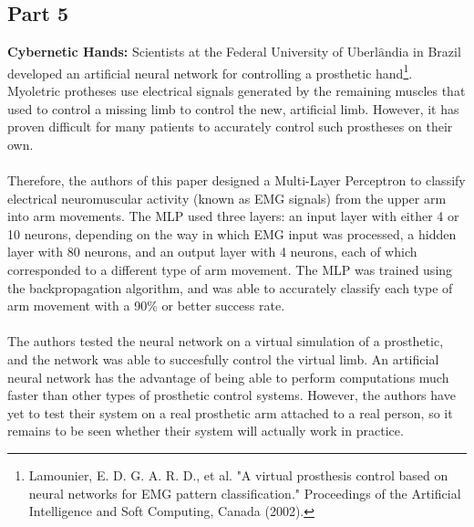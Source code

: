 \documentclass[11pt]{article}
\begin{document}
\subsection*{Part 5}

{\bf Cybernetic Hands:} Scientists at the Federal University of Uberl$\hat{\text{a}}$ndia in Brazil developed an artificial neural network for controlling a prosthetic hand\footnote{Lamounier, E. D. G. A. R. D., et al. "A virtual prosthesis control based on neural networks for EMG pattern classification." Proceedings of the Artificial Intelligence and Soft Computing, Canada (2002).}. Myoletric protheses use electrical signals generated by the remaining muscles that used to control a missing limb to control the new, artificial limb. However, it has proven difficult for many patients to accurately control such prostheses on their own. \\
\\
Therefore, the authors of this paper designed a Multi-Layer Perceptron to classify electrical neuromuscular activity (known as EMG signals) from the upper arm into arm movements. The MLP used three layers: an input layer with either 4 or 10 neurons, depending on the way in which EMG input was processed, a hidden layer with 80 neurons, and an output layer with 4 neurons, each of which corresponded to a different type of arm movement. The MLP was trained using the backpropagation algorithm, and was able to accurately classify each type of arm movement with a 90\% or better success rate. \\
\\
The authors tested the neural network on a virtual simulation of a prosthetic, and the network was able to succesfully control the virtual limb. An artificial neural network has the advantage of being able to perform computations much faster than other types of prosthetic control systems. However, the authors have yet to test their system on a real prosthetic arm attached to a real person, so it remains to be seen whether their system will actually work in practice.
\end{document}
